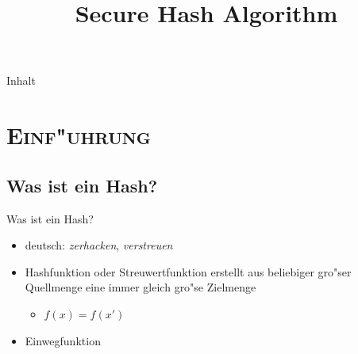 \documentclass[xcolor=x11names,compress]{beamer}
\title[Secure Hash Algorithm]{Secure Hash Algorithm}
\renewcommand{\(}{\begin{columns}}
\renewcommand{\)}{\end{columns}}
\newcommand{\<}[1]{\begin{column}{#1}}
\renewcommand{\>}{\end{column}}
\begin{document}

\begin{frame}{Inhalt}
\tableofcontents%
\end{frame}


\section{\scshape Einf"uhrung}
\subsection{Was ist ein Hash?}
\begin{frame}{Was ist ein Hash?}

\begin{itemize}
\item deutsch:  \glqq\textit{zerhacken}\grqq, \glqq \textit{verstreuen}\grqq
	\pause
\item Hashfunktion oder Streuwertfunktion erstellt aus beliebiger gro"ser Quellmenge eine immer gleich gro"se Zielmenge
\begin{itemize}
\item $ f(x) = f(x') $
	\pause
\end{itemize}
\item Einwegfunktion
\end{itemize}
\end{frame}

\end{document}
